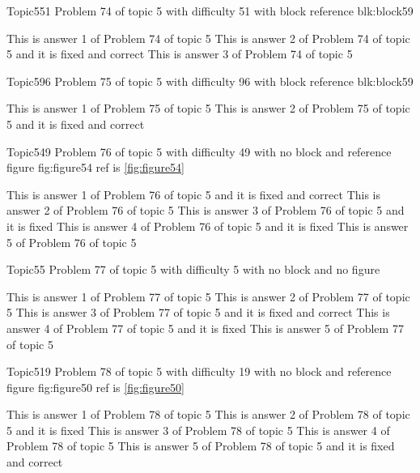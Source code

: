 \documentclass[master]{exam}
\begin{document}
\begin{problem}[requires=blk:block59]{Topic5}{51}
	Problem 74 of topic 5 with difficulty 51 with block reference blk:block59
	\begin{answers}
		\answer This is answer 1 of Problem 74 of topic 5 
		 This is answer 2 of Problem 74 of topic 5 and it is fixed and correct
		\answer This is answer 3 of Problem 74 of topic 5 
	\end{answers}
\end{problem}

\begin{problem}[requires=blk:block59]{Topic5}{96}
	Problem 75 of topic 5 with difficulty 96 with block reference blk:block59
	\begin{answers}
		\answer This is answer 1 of Problem 75 of topic 5 
		 This is answer 2 of Problem 75 of topic 5 and it is fixed and correct
	\end{answers}
\end{problem}

\begin{problem}{Topic5}{49}
	Problem 76 of topic 5 with difficulty 49 with no block and reference figure fig:figure54 ref is \ref{fig:figure54}
	\begin{answers}
		 This is answer 1 of Problem 76 of topic 5 and it is fixed and correct
		\answer This is answer 2 of Problem 76 of topic 5 
		\answer[fixed] This is answer 3 of Problem 76 of topic 5 and it is fixed
		\answer[fixed] This is answer 4 of Problem 76 of topic 5 and it is fixed
		\answer This is answer 5 of Problem 76 of topic 5 
	\end{answers}
\end{problem}

\begin{problem}{Topic5}{5}
	Problem 77 of topic 5 with difficulty 5 with no block and no figure
	\begin{answers}
		\answer This is answer 1 of Problem 77 of topic 5 
		\answer This is answer 2 of Problem 77 of topic 5 
		 This is answer 3 of Problem 77 of topic 5 and it is fixed and correct
		\answer[fixed] This is answer 4 of Problem 77 of topic 5 and it is fixed
		\answer This is answer 5 of Problem 77 of topic 5 
	\end{answers}
\end{problem}

\begin{problem}{Topic5}{19}
	Problem 78 of topic 5 with difficulty 19 with no block and reference figure fig:figure50 ref is \ref{fig:figure50}
	\begin{answers}
		\answer This is answer 1 of Problem 78 of topic 5 
		\answer[fixed] This is answer 2 of Problem 78 of topic 5 and it is fixed
		\answer This is answer 3 of Problem 78 of topic 5 
		\answer This is answer 4 of Problem 78 of topic 5 
		 This is answer 5 of Problem 78 of topic 5 and it is fixed and correct
	\end{answers}
\end{problem}
\end{document}
